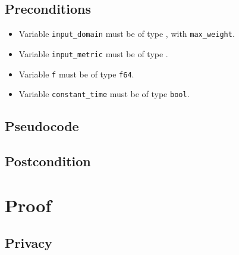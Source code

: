 \documentclass{article}
\begin{document}
\subsection{Preconditions}
\begin{itemize}
	\item Variable \texttt{input\_domain} must be of type , with \texttt{max\_weight}.
	\item Variable \texttt{input\_metric} must be of type .
	\item Variable \texttt{f} must be of type \texttt{f64}.
    \item Variable \texttt{constant\_time} must be of type \texttt{bool}.
\end{itemize}

\subsection{Pseudocode}



\subsection{Postcondition}


\section{Proof}

\subsection{Privacy}
\end{document}
